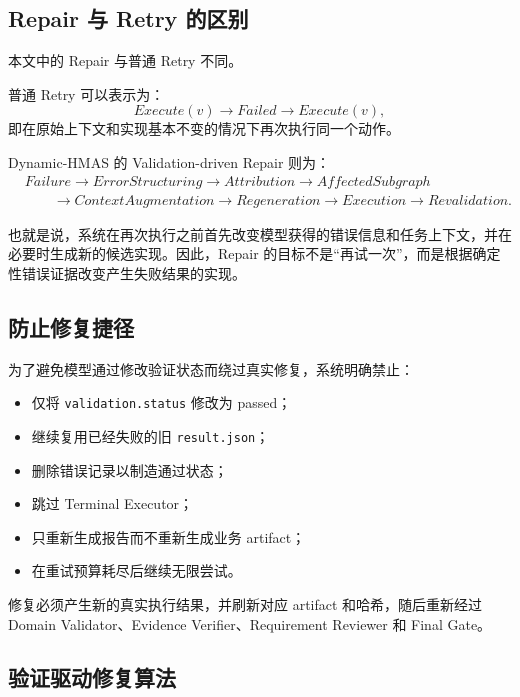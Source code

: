 \documentclass[UTF8,a4paper,12pt,oneside]{ctexbook}
\begin{document}
\subsection{Repair 与 Retry 的区别}

本文中的 Repair 与普通 Retry 不同。

普通 Retry 可以表示为：
\[
Execute(v)
\rightarrow
Failed
\rightarrow
Execute(v),
\]
即在原始上下文和实现基本不变的情况下再次执行同一个动作。

Dynamic-HMAS 的 Validation-driven Repair 则为：
\[
\begin{aligned}
&Failure
\rightarrow ErrorStructuring
\rightarrow Attribution
\rightarrow AffectedSubgraph \\[3pt]
&\qquad\rightarrow ContextAugmentation
\rightarrow Regeneration
\rightarrow Execution
\rightarrow Revalidation.
\end{aligned}
\]

也就是说，系统在再次执行之前首先改变模型获得的错误信息和任务上下文，并在必要时生成新的候选实现。因此，Repair 的目标不是“再试一次”，而是根据确定性错误证据改变产生失败结果的实现。


\subsection{防止修复捷径}

为了避免模型通过修改验证状态而绕过真实修复，系统明确禁止：

\begin{itemize}
    \item 仅将 \texttt{validation.status} 修改为 passed；
    \item 继续复用已经失败的旧 \texttt{result.json}；
    \item 删除错误记录以制造通过状态；
    \item 跳过 Terminal Executor；
    \item 只重新生成报告而不重新生成业务 artifact；
    \item 在重试预算耗尽后继续无限尝试。
\end{itemize}

修复必须产生新的真实执行结果，并刷新对应 artifact 和哈希，随后重新经过 Domain Validator、Evidence Verifier、Requirement Reviewer 和 Final Gate。


\subsection{验证驱动修复算法}
\end{document}
